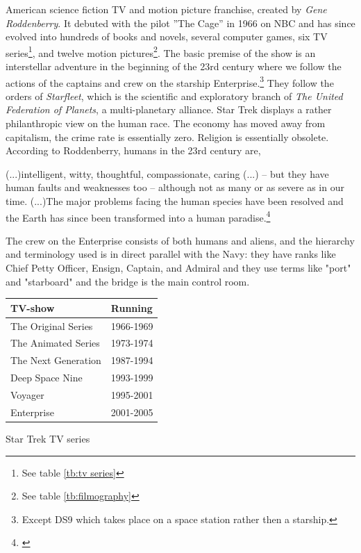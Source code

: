  American science fiction TV and motion picture franchise, created by \textit{Gene Roddenberry}. It debuted with the pilot ''The Cage'' in 1966 on NBC and has since evolved into hundreds of books and novels, several computer games, six TV series\footnote{See table \ref{tb:tv series}}, and twelve motion pictures\footnote{See table \ref{tb:filmography}}. The basic premise of the show is an interstellar adventure in the beginning of the 23rd century where we follow the actions of the captains and crew on the starship Enterprise.\footnote{Except DS9 which takes place on a space station rather then a starship.} They follow the orders of \textit{Starfleet}, which is the scientific and exploratory branch of \textit{The United Federation of Planets}, a multi-planetary alliance. Star Trek displays a rather philanthropic view on the human race. The economy has moved away from capitalism, the crime rate is essentially zero. Religion is essentially obsolete. According to Roddenberry, humans in the 23rd century are,
\begin{displayquote}
(...)intelligent, witty, thoughtful, compassionate, caring (...) -- but they have human faults and weaknesses too -- although not as many or as severe as in our time. (...)The major problems facing the human species have been resolved and the Earth has since been transformed into a human paradise.\footnote{\citealt{roddenberry_star_1987}}
\end{displayquote}
The crew on the Enterprise consists of both humans and aliens, and the hierarchy and terminology used is in direct parallel with the Navy: they have ranks like Chief Petty Officer, Ensign, Captain, and Admiral and they use terms like "port" and "starboard" and the bridge is the main control room. 

\begin{margintable}
\small
\begin{tabular}{ll}
\toprule
	\textbf{TV-show}		& \textbf{Running}	\\
\midrule
    	The Original Series		& 1966-1969		\\
        The Animated Series		& 1973-1974		\\
        The Next Generation 	& 1987-1994		\\
        Deep Space Nine 		& 1993-1999		\\
        Voyager					& 1995-2001		\\
        Enterprise				& 2001-2005		\\
\bottomrule
\end{tabular}
	\caption{Star Trek TV series}
	\label{tb:tv series}
\end{margintable}

